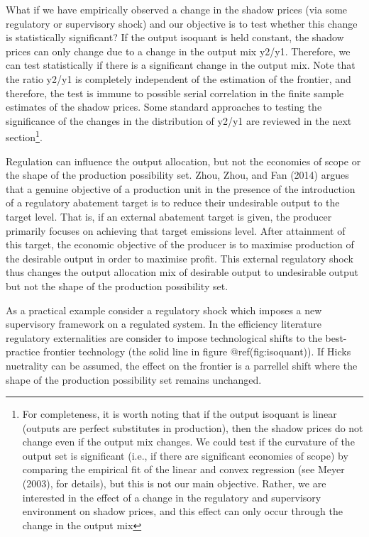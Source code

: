 \documentclass[
  10pt,
]{article}
\begin{document}
What if we have empirically observed a change in the shadow prices (via
some regulatory or supervisory shock) and our objective is to test
whether this change is statistically significant? If the output isoquant
is held constant, the shadow prices can only change due to a change in
the output mix y2/y1. Therefore, we can test statistically if there is a
significant change in the output mix. Note that the ratio y2/y1 is
completely independent of the estimation of the frontier, and therefore,
the test is immune to possible serial correlation in the finite sample
estimates of the shadow prices. Some standard approaches to testing the
significance of the changes in the distribution of y2/y1 are reviewed in
the next section\footnote{For completeness, it is worth noting that if
  the output isoquant is linear (outputs are perfect substitutes in
  production), then the shadow prices do not change even if the output
  mix changes. We could test if the curvature of the output set is
  significant (i.e., if there are significant economies of scope) by
  comparing the empirical fit of the linear and convex regression (see
  Meyer (2003), for details), but this is not our main objective.
  Rather, we are interested in the effect of a change in the regulatory
  and supervisory environment on shadow prices, and this effect can only
  occur through the change in the output mix}.

Regulation can influence the output allocation, but not the economies of
scope or the shape of the production possibility set. Zhou, Zhou, and
Fan (2014) argues that a genuine objective of a production unit in the
presence of the introduction of a regulatory abatement target is to
reduce their undesirable output to the target level. That is, if an
external abatement target is given, the producer primarily focuses on
achieving that target emissions level. After attainment of this target,
the economic objective of the producer is to maximise production of the
desirable output in order to maximise profit. This external regulatory
shock thus changes the output allocation mix of desirable output to
undesirable output but not the shape of the production possibility set.

As a practical example consider a regulatory shock which imposes a new
supervisory framework on a regulated system. In the efficiency
literature regulatory externalities are consider to impose technological
shifts to the best-practice frontier technology (the solid line in
figure @ref(fig:isoquant)). If Hicks nuetrality can be assumed, the
effect on the frontier is a parrellel shift where the shape of the
production possibility set remains unchanged.
\end{document}
